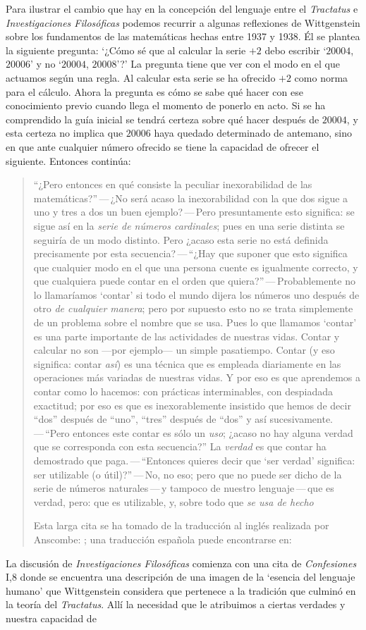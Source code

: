 Para ilustrar el cambio que hay en la concepción del lenguaje entre el \emph{Tractatus} e \emph{Investigaciones Filosóficas} podemos recurrir a algunas reflexiones de Wittgenstein sobre los fundamentos de las matemáticas hechas entre 1937 y 1938. Él se plantea la siguiente pregunta: \enquote*{¿Cómo sé que al calcular la serie $+2$ debo escribir `$20004$, $20006$' y no `$20004$, $20008$'?} La pregunta tiene que ver con el modo en el que actuamos según una regla. Al calcular esta serie se ha ofrecido $+2$ como norma para el cálculo. Ahora la pregunta es cómo se sabe qué hacer con ese conocimiento previo cuando llega el momento de ponerlo en acto. Si se ha comprendido la guía inicial se tendrá certeza sobre qué hacer después de $20004$, y esta certeza no implica que $20006$ haya quedado determinado de antemano, sino en que ante cualquier número ofrecido se tiene la capacidad de ofrecer el siguiente. Entonces continúa: \blockquote[Esta larga cita se ha tomado de la traducción al inglés realizada por Anscombe: {\cite[I, \S4]{wittgenstein1956remmath}}; una traducción española puede encontrarse en: {\cite[17--18]{wittgenstein1956remmathes}}]{``¿Pero entonces en qué consiste la peculiar inexorabilidad de las matemáticas?''\,---\,¿No será acaso la inexorabilidad con la que dos sigue a uno y tres a dos un buen ejemplo?\,---\,Pero presuntamente esto significa: se sigue así en la \emph{serie de números cardinales}; pues en una serie distinta se seguiría de un modo distinto. Pero ¿acaso esta serie no está definida precisamente por esta secuencia?\,---\,``¿Hay que suponer que esto significa que cualquier modo en el que una persona cuente es igualmente correcto, y que cualquiera puede contar en el orden que quiera?''\,---\,Probablemente no lo llamaríamos `contar' si todo el mundo dijera los números uno después de otro \emph{de cualquier manera}; pero por supuesto esto no se trata simplemente de un problema sobre el nombre que se usa. Pues lo que llamamos `contar' es una parte importante de las actividades de nuestras vidas. Contar y calcular no son ---por ejemplo--- un simple pasatiempo. Contar (y eso significa: contar \emph{así}) es una técnica que es empleada diariamente en las operaciones más variadas de nuestras vidas. Y por eso es que aprendemos a contar como lo hacemos: con prácticas interminables, con despiadada exactitud; por eso es que es inexorablemente insistido que hemos de decir ``dos'' después de ``uno'', ``tres'' después de ``dos'' y así sucesivamente.\,---\,``Pero entonces este contar es sólo un \emph{uso}; ¿acaso no hay alguna verdad que se corresponda con esta secuencia?'' La \emph{verdad} es que contar ha demostrado que paga.\,---\,``Entonces quieres decir que `ser verdad' significa: ser utilizable (o útil)?''\,---\,No, no eso; pero que no puede ser dicho de la serie de números naturales\,---\,y tampoco de nuestro lenguaje\,---\,que es verdad, pero: que es utilizable, y, sobre todo que \emph{se usa de hecho}}. La discusión de \emph{Investigaciones Filosóficas} comienza con una cita de \emph{Confesiones} I,8 donde se encuentra una descripción de una imagen de la `esencia del lenguaje humano' que Wittgenstein considera que pertenece a la tradición que culminó en la teoría del \emph{Tractatus}. Allí la necesidad que le atribuimos a ciertas verdades y nuestra capacidad de 